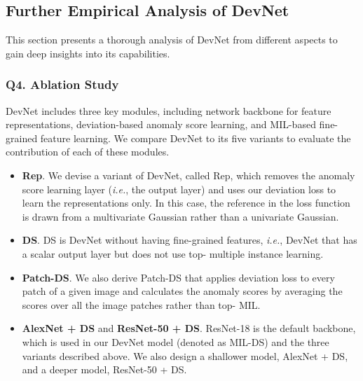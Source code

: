 \documentclass[10pt,journal,compsoc]{IEEEtran}
\newcommand{\ie}{\textit{i.e.}}
\begin{document}
\subsection{Further Empirical Analysis of DevNet }\label{subsec:ablation}

This section presents a thorough analysis of DevNet from different aspects to gain deep insights into its capabilities.

\subsubsection{Q4. Ablation Study}
DevNet includes three key modules, including network backbone for feature representations, deviation-based anomaly score learning, and MIL-based fine-grained feature learning. We compare DevNet to its five variants to evaluate the contribution of each of these modules.

\begin{itemize}
    \item \textbf{Rep}. We devise a variant of DevNet, called Rep, which removes the anomaly score learning layer (\ie, the output layer) and uses our deviation loss to learn the representations only. In this case, the reference in the loss function is drawn from a multivariate Gaussian rather than a univariate Gaussian.
    \item \textbf{DS}. DS is DevNet without having fine-grained features, \ie, DevNet that has a scalar output layer but does not use top- multiple instance learning.
    \item \textbf{Patch-DS}. We also derive Patch-DS that applies deviation loss to every patch of a given image and calculates the anomaly scores by averaging the scores over all the image patches rather than top- MIL.
    \item \textbf{AlexNet + DS} and \textbf{ResNet-50 + DS}. ResNet-18 is the default backbone, which is used in our DevNet model (denoted as MIL-DS) and the three variants described above. We also design a shallower model, AlexNet + DS, and a deeper model, ResNet-50 + DS.
\end{itemize}
\end{document}
